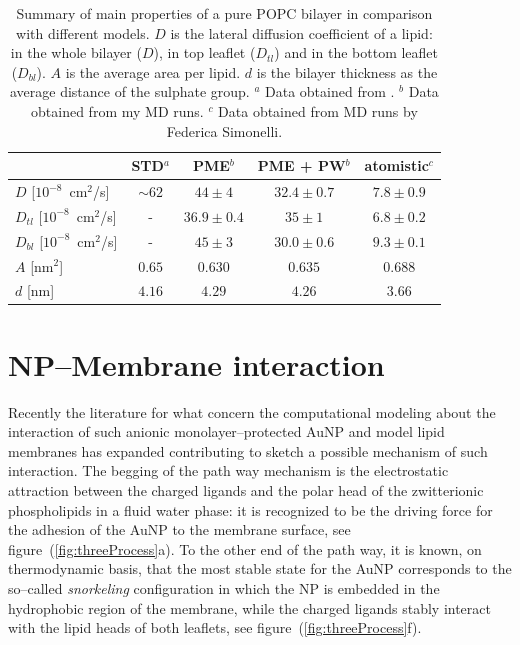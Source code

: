 \begin{table}[h!t]
	\centering
	\begin{tabular}{lcccc}
		\toprule
		\,				& STD$^a$	& \acs{PME}$^b$	& \acs{PME} + \acs{PW}$^b$ & atomistic$^c$ 	 \\ \toprule
		$D$	[$10^{-8}$~cm$^2$/s]	& $\sim62$	& $44 \pm 4$	& $32.4 \pm 0.7$ & $7.8 \pm 0.9$ \\ \midrule
		$D_{tl}$ [$10^{-8}$~cm$^2$/s] & -		& $36.9 \pm 0.4$& $35 \pm 1$	 & $6.8 \pm 0.2$ \\ \midrule
		$D_{bl}$ [$10^{-8}$~cm$^2$/s] & -		& $45 \pm 3$	& $30.0 \pm 0.6$ & $9.3 \pm 0.1$ \\ \midrule
		$A$ [nm$^2$]				& $0.65$	& $0.630$		& $0.635$		 & $0.688$		 \\ \midrule
		$d$ [nm]					& $4.16$	& $4.29$		& $4.26$ 		 & $3.66$		 \\ \bottomrule
	\end{tabular}
	\caption{Summary of main properties of a pure \acs{POPC} bilayer in comparison with different models. $D$ is the lateral diffusion coefficient of a lipid: in the whole bilayer ($D$), in top leaflet ($D_{tl}$) and in the bottom leaflet ($D_{bl}$). $A$ is the average area per lipid. $d$ is the bilayer thickness as the average distance of the sulphate group. \footnotesize $^a$ Data obtained from \cite{Rossi2014}. $^b$ Data obtained from my \ac{MD} runs. $^c$ Data obtained from \ac{MD} runs by Federica Simonelli.}
	\label{tab:POPCData}
\end{table}

\newpage
\section{NP--Membrane interaction}
Recently the literature for what concern the computational modeling about the interaction of such anionic monolayer--protected \ac{AuNP} and model lipid membranes has expanded contributing to sketch a possible mechanism of such interaction. The begging of the path way mechanism is the electrostatic attraction between the charged ligands and the polar head of the zwitterionic phospholipids in a fluid water phase: it is recognized to be the driving force for the adhesion of the \ac{AuNP} to the membrane surface, see figure~(\ref{fig:threeProcess}a). To the other end of the path way, it is known, on thermodynamic basis, that the most stable state for the \ac{AuNP} corresponds to the so--called \textit{snorkeling} configuration in which the \ac{NP} is embedded in the hydrophobic region of the membrane, while the charged ligands stably interact with the lipid heads of both leaflets, see figure~(\ref{fig:threeProcess}f). 

